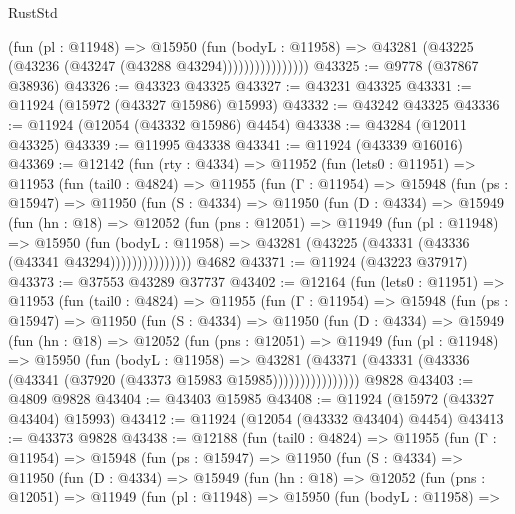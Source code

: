 \begin{lexlean}{RustStd}
\begin{coremodule}
                        (fun (pl : @11948) =>
                        @15950
                          (fun (bodyL : @11958) =>
                          @43281 (@43225 (@43236 (@43247 (@43288 @43294))))))))))))))))
@43325 := @9778 (@37867 @38936)
@43326 := @43323 @43325
@43327 := @43231 @43325
@43331 := @11924 (@15972 (@43327 @15986) @15993)
@43332 := @43242 @43325
@43336 := @11924 (@12054 (@43332 @15986) @4454)
@43338 := @43284 (@12011 @43325)
@43339 := @11995 @43338
@43341 := @11924 (@43339 @16016)
@43369 := @12142
    (fun (rty : @4334) =>
    @11952
      (fun (lets0 : @11951) =>
      @11953
        (fun (tail0 : @4824) =>
        @11955
          (fun (Γ : @11954) =>
          @15948
            (fun (ps : @15947) =>
            @11950
              (fun (S : @4334) =>
              @11950
                (fun (D : @4334) =>
                @15949
                  (fun (hn : @18) =>
                  @12052
                    (fun (pns : @12051) =>
                    @11949
                      (fun (pl : @11948) =>
                      @15950
                        (fun (bodyL : @11958) =>
                        @43281 (@43225 (@43331 (@43336 (@43341 @43294)))))))))))))))
    @4682
@43371 := @11924 (@43223 @37917)
@43373 := @37553 @43289 @37737
@43402 := @12164
    (fun (lets0 : @11951) =>
    @11953
      (fun (tail0 : @4824) =>
      @11955
        (fun (Γ : @11954) =>
        @15948
          (fun (ps : @15947) =>
          @11950
            (fun (S : @4334) =>
            @11950
              (fun (D : @4334) =>
              @15949
                (fun (hn : @18) =>
                @12052
                  (fun (pns : @12051) =>
                  @11949
                    (fun (pl : @11948) =>
                    @15950
                      (fun (bodyL : @11958) =>
                      @43281
                        (@43371
                          (@43331 (@43336 (@43341 (@37920 (@43373 @15983 @15985))))))))))))))))
    @9828
@43403 := @4809 @9828
@43404 := @43403 @15985
@43408 := @11924 (@15972 (@43327 @43404) @15993)
@43412 := @11924 (@12054 (@43332 @43404) @4454)
@43413 := @43373 @9828
@43438 := @12188
    (fun (tail0 : @4824) =>
    @11955
      (fun (Γ : @11954) =>
      @15948
        (fun (ps : @15947) =>
        @11950
          (fun (S : @4334) =>
          @11950
            (fun (D : @4334) =>
            @15949
              (fun (hn : @18) =>
              @12052
                (fun (pns : @12051) =>
                @11949
                  (fun (pl : @11948) =>
                  @15950
                    (fun (bodyL : @11958) =>

\end{coremodule}
\end{lexlean}
